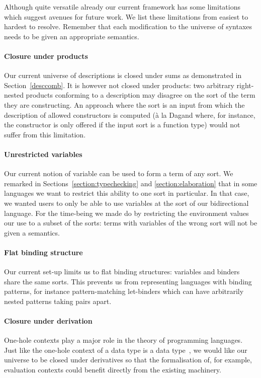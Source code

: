 Although quite versatile already our current framework has some limitations
which suggest avenues for future work. We list these limitations from easiest
to hardest to resolve. Remember that each modification to the universe of
syntaxes needs to be given an appropriate semantics.

\paragraph*{Closure under products} Our current universe of descriptions is
closed under sums as demonstrated in Section~\ref{desccomb}. It is however
not closed under products: two arbitrary right-nested products conforming
to a description may disagree on the sort of the term they are constructing.
An approach where the sort is an input from which the description of allowed
constructors is computed (à la Dagand \citeyear{DBLP:phd/ethos/Dagand13} where,
for instance, the  constructor is only offered if the input sort is
a function type) would not suffer from this limitation.

\paragraph*{Unrestricted variables} Our current notion of variable can be used
to form a term of any sort. We remarked in Sections~\ref{section:typechecking}
and \ref{section:elaboration} that in some languages we want to restrict this
ability to one sort in particular. In that case, we wanted users to only be able
to use variables at the sort  of our bidirectional language. For the
time-being we made do by restricting the environment values our 
use to a subset of the sorts: terms with variables of the wrong sort will not be
given a semantics.

\paragraph*{Flat binding structure} Our current set-up limits us to flat binding
structures: variables and binders share the same sorts. This prevents us from
representing languages with binding patterns, for instance pattern-matching
let-binders which can have arbitrarily nested patterns taking pairs apart.

\paragraph*{Closure under derivation} One-hole contexts play a major role in the
theory of programming languages. Just like the one-hole context of a data type is
a data type~\cite{DBLP:journals/fuin/AbbottAMG05}, we would like our universe to
be closed under derivatives so that the formalisation of, for example, evaluation contexts
could benefit directly from the existing machinery.

